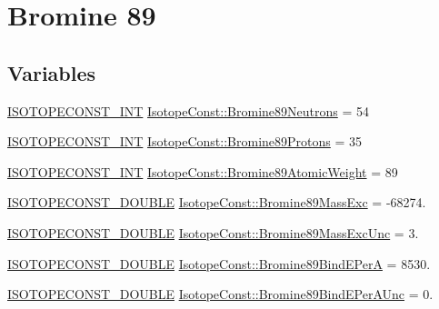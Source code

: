 \hypertarget{group___isotope_const-_bromine-_br89}{}\section{Bromine 89}
\label{group___isotope_const-_bromine-_br89}
\subsection*{Variables}
\begin{DoxyCompactItemize}
\item 
\mbox{\hyperlink{group___isotope_const-_macros_ga5f18360b3e99483a35c32d789e62621c}{I\+S\+O\+T\+O\+P\+E\+C\+O\+N\+S\+T\+\_\+\+I\+NT}} \mbox{\hyperlink{group___isotope_const-_bromine-_br89_gaf6a57d77f6ab88f2ef20d7a7192e8b57}{Isotope\+Const\+::\+Bromine89\+Neutrons}} = 54
\item 
\mbox{\hyperlink{group___isotope_const-_macros_ga5f18360b3e99483a35c32d789e62621c}{I\+S\+O\+T\+O\+P\+E\+C\+O\+N\+S\+T\+\_\+\+I\+NT}} \mbox{\hyperlink{group___isotope_const-_bromine-_br89_gae82570bc0041cfc7214eedcbc809b159}{Isotope\+Const\+::\+Bromine89\+Protons}} = 35
\item 
\mbox{\hyperlink{group___isotope_const-_macros_ga5f18360b3e99483a35c32d789e62621c}{I\+S\+O\+T\+O\+P\+E\+C\+O\+N\+S\+T\+\_\+\+I\+NT}} \mbox{\hyperlink{group___isotope_const-_bromine-_br89_ga046204d3083540905bb98360ebcd1af6}{Isotope\+Const\+::\+Bromine89\+Atomic\+Weight}} = 89
\item 
\mbox{\hyperlink{group___isotope_const-_macros_ga8f45a7272ce02c0b4c65c44636ed719a}{I\+S\+O\+T\+O\+P\+E\+C\+O\+N\+S\+T\+\_\+\+D\+O\+U\+B\+LE}} \mbox{\hyperlink{group___isotope_const-_bromine-_br89_ga64df60c6c641cbc8620e15b6594ce31f}{Isotope\+Const\+::\+Bromine89\+Mass\+Exc}} = -\/68274.
\item 
\mbox{\hyperlink{group___isotope_const-_macros_ga8f45a7272ce02c0b4c65c44636ed719a}{I\+S\+O\+T\+O\+P\+E\+C\+O\+N\+S\+T\+\_\+\+D\+O\+U\+B\+LE}} \mbox{\hyperlink{group___isotope_const-_bromine-_br89_gad46b150922f3f9a89f3e46bf8c8b0f4a}{Isotope\+Const\+::\+Bromine89\+Mass\+Exc\+Unc}} = 3.
\item 
\mbox{\hyperlink{group___isotope_const-_macros_ga8f45a7272ce02c0b4c65c44636ed719a}{I\+S\+O\+T\+O\+P\+E\+C\+O\+N\+S\+T\+\_\+\+D\+O\+U\+B\+LE}} \mbox{\hyperlink{group___isotope_const-_bromine-_br89_ga6157fa0ec37326128a94528e182b566c}{Isotope\+Const\+::\+Bromine89\+Bind\+E\+PerA}} = 8530.
\item 
\mbox{\hyperlink{group___isotope_const-_macros_ga8f45a7272ce02c0b4c65c44636ed719a}{I\+S\+O\+T\+O\+P\+E\+C\+O\+N\+S\+T\+\_\+\+D\+O\+U\+B\+LE}} \mbox{\hyperlink{group___isotope_const-_bromine-_br89_gad01ddcf13d36082ff74f7aed56db8919}{Isotope\+Const\+::\+Bromine89\+Bind\+E\+Per\+A\+Unc}} = 0.

\end{DoxyCompactItemize}
